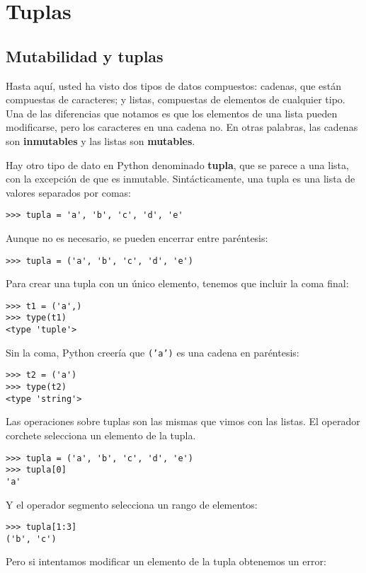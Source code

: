 
\chapter{Tuplas}

\label{tuplechap} 

\section{Mutabilidad y tuplas}

  

Hasta aquí, usted ha visto dos tipos de datos compuestos: cadenas,
que están compuestas de caracteres; y listas, compuestas de elementos
de cualquier tipo. Una de las diferencias que notamos es que los elementos
de una lista pueden modificarse, pero los caracteres en una cadena
no. En otras palabras, las cadenas son \textbf{inmutables} y las listas
son \textbf{mutables}.

 

Hay otro tipo de dato en Python denominado \textbf{tupla}, que se
parece a una lista, con la excepción de que es inmutable. Sintácticamente,
una tupla es una lista de valores separados por comas:
\begin{lstlisting}
>>> tupla = 'a', 'b', 'c', 'd', 'e'
\end{lstlisting}
Aunque no es necesario, se pueden encerrar entre paréntesis:
\begin{lstlisting}
>>> tupla = ('a', 'b', 'c', 'd', 'e')
\end{lstlisting}
Para crear una tupla con un único elemento, tenemos que incluir la
coma final:
\begin{lstlisting}
>>> t1 = ('a',)
>>> type(t1)
<type 'tuple'>
\end{lstlisting}
Sin la coma, Python creería que \texttt{('a')} es una cadena en paréntesis:
\begin{lstlisting}
>>> t2 = ('a')
>>> type(t2)
<type 'string'>
\end{lstlisting}
Las operaciones sobre tuplas son las mismas que vimos con las listas.
El operador corchete selecciona un elemento de la tupla.
\begin{lstlisting}
>>> tupla = ('a', 'b', 'c', 'd', 'e')
>>> tupla[0]
'a'
\end{lstlisting}
Y el operador segmento selecciona un rango de elementos:
\begin{lstlisting}
>>> tupla[1:3]
('b', 'c')
\end{lstlisting}
Pero si intentamos modificar un elemento de la tupla obtenemos un
error:

